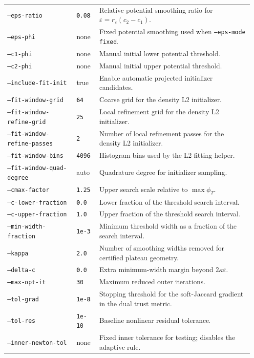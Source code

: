\documentclass[11pt]{article}
\begin{document}
\begin{longtable}{>{\raggedright\arraybackslash}p{}
                  >{\raggedright\arraybackslash}p{}
                  >{\raggedright\arraybackslash}p{}}
\texttt{--eps-ratio} & \texttt{0.08} & Relative potential smoothing ratio for $\varepsilon=r_\varepsilon(c_2-c_1)$. \\
\texttt{--eps-phi} & none & Fixed potential smoothing used when \texttt{--eps-mode fixed}. \\
\texttt{--c1-phi} & none & Manual initial lower potential threshold. \\
\texttt{--c2-phi} & none & Manual initial upper potential threshold. \\
\texttt{--include-fit-init} & true & Enable automatic projected initializer candidates. \\
\texttt{--fit-window-grid} & \texttt{64} & Coarse grid for the density L2 initializer. \\
\texttt{--fit-window-refine-grid} & \texttt{25} & Local refinement grid for the density L2 initializer. \\
\texttt{--fit-window-refine-passes} & \texttt{2} & Number of local refinement passes for the density L2 initializer. \\
\texttt{--fit-window-bins} & \texttt{4096} & Histogram bins used by the L2 fitting helper. \\
\texttt{--fit-window-quad-degree} & auto & Quadrature degree for initializer sampling. \\
\texttt{--cmax-factor} & \texttt{1.25} & Upper search scale relative to $\max\phi_T$. \\
\texttt{--c-lower-fraction} & \texttt{0.0} & Lower fraction of the threshold search interval. \\
\texttt{--c-upper-fraction} & \texttt{1.0} & Upper fraction of the threshold search interval. \\
\texttt{--min-width-fraction} & \texttt{1e-3} & Minimum threshold width as a fraction of the search interval. \\
\texttt{--kappa} & \texttt{2.0} & Number of smoothing widths removed for certified plateau geometry. \\
\texttt{--delta-c} & \texttt{0.0} & Extra minimum-width margin beyond $2\kappa\varepsilon$. \\
\texttt{--max-opt-it} & \texttt{30} & Maximum reduced outer iterations. \\
\texttt{--tol-grad} & \texttt{1e-8} & Stopping threshold for the soft-Jaccard gradient in the dual trust metric. \\
\texttt{--tol-res} & \texttt{1e-10} & Baseline nonlinear residual tolerance. \\
\texttt{--inner-newton-tol} & none & Fixed inner tolerance for testing; disables the adaptive rule. \\

\end{longtable}
\end{document}
